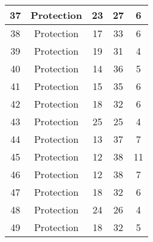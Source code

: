 \documentclass[results.tex]{subfiles}
\begin{document}
\begin{center}
\begin{tabular}{| c || c | c | c | c |}
            \hline
            37                      & Protection                   & 23                     & 27                      & 6                    \\
            \hline
            38                      & Protection                   & 17                     & 33                      & 6                    \\
            \hline
            39                      & Protection                   & 19                     & 31                      & 4                    \\
            \hline
            40                      & Protection                   & 14                     & 36                      & 5                    \\
            \hline
            41                      & Protection                   & 15                     & 35                      & 6                    \\
            \hline
            42                      & Protection                   & 18                     & 32                      & 6                    \\
            \hline
            43                      & Protection                   & 25                     & 25                      & 4                    \\
            \hline
            44                      & Protection                   & 13                     & 37                      & 7                    \\
            \hline
            45                      & Protection                   & 12                     & 38                      & 11                   \\
            \hline
            46                      & Protection                   & 12                     & 38                      & 7                    \\
            \hline
            47                      & Protection                   & 18                     & 32                      & 6                    \\
            \hline
            48                      & Protection                   & 24                     & 26                      & 4                    \\
            \hline
            49                      & Protection                   & 18                     & 32                      & 5                    \\
            \hline
        \end{tabular}
    \end{center}
\end{document}
